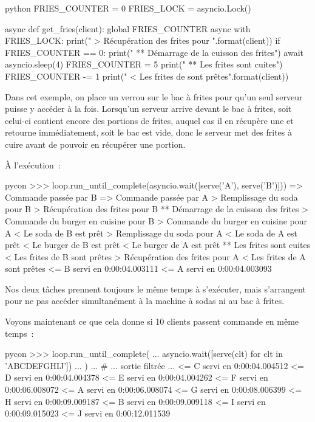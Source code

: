 \documentclass[small]{zmdocument}
\begin{document}
\begin{CodeBlock}{python}
FRIES_COUNTER = 0
FRIES_LOCK = asyncio.Lock()

async def get_fries(client):
    global FRIES_COUNTER
    async with FRIES_LOCK:
        print("    > Récupération des frites pour {}".format(client))
        if FRIES_COUNTER == 0:
            print("   ** Démarrage de la cuisson des frites")
            await asyncio.sleep(4)
            FRIES_COUNTER = 5
            print("   ** Les frites sont cuites")
        FRIES_COUNTER -= 1
        print("    < Les frites de {} sont prêtes".format(client))
\end{CodeBlock}



Dans cet exemple, on place un verrou sur le bac à frites pour qu’un seul
serveur puisse y accéder à la fois. Lorsqu’un serveur arrive devant le bac à
frites, soit celui-ci contient encore des portions de frites, auquel cas il en
récupère une et retourne immédiatement, soit le bac est vide, donc le serveur
met des frites à cuire avant de pouvoir en récupérer une portion.



À l’exécution :



\begin{CodeBlock}{pycon}
>>> loop.run_until_complete(asyncio.wait([serve('A'), serve('B')]))
=> Commande passée par B
=> Commande passée par A
    > Remplissage du soda pour B
    > Récupération des frites pour B
   ** Démarrage de la cuisson des frites
    > Commande du burger en cuisine pour B
    > Commande du burger en cuisine pour A
    < Le soda de B est prêt
    > Remplissage du soda pour A
    < Le soda de A est prêt
    < Le burger de B est prêt
    < Le burger de A est prêt
   ** Les frites sont cuites
    < Les frites de B sont prêtes
    > Récupération des frites pour A
    < Les frites de A sont prêtes
<= B servi en 0:00:04.003111
<= A servi en 0:00:04.003093
\end{CodeBlock}



Nos deux tâches prennent toujours le même temps à s’exécuter, mais
s’arrangent pour ne pas accéder simultanément à la machine à sodas ni au bac à
frites.



Voyons maintenant ce que cela donne si 10 clients passent commande en même
temps :



\begin{CodeBlock}{pycon}
>>> loop.run_until_complete(
...     asyncio.wait([serve(clt) for clt in 'ABCDEFGHIJ'])
... )
...
# ... sortie filtrée ...
<= C servi en 0:00:04.004512
<= D servi en 0:00:04.004378
<= E servi en 0:00:04.004262
<= F servi en 0:00:06.008072
<= A servi en 0:00:06.008074
<= G servi en 0:00:08.006399
<= H servi en 0:00:09.009187
<= B servi en 0:00:09.009118
<= I servi en 0:00:09.015023
<= J servi en 0:00:12.011539
\end{CodeBlock}
\end{document}
